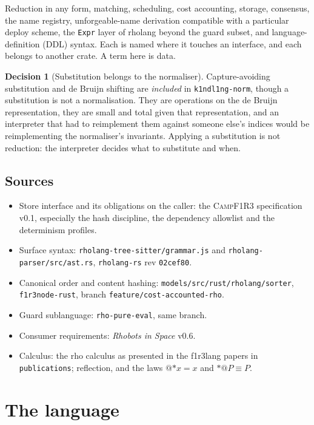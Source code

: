 \documentclass[11pt,a4paper]{article}
\newcommand{\code}[1]{\texttt{#1}}
\newcommand{\Camp}{\textsc{CampF1R3}}
\theoremstyle{definition}
\newtheorem{decision}[definition]{Decision}
\theoremstyle{plain}
\begin{document}
Reduction in any form, matching, scheduling, cost accounting, storage,
consensus, the name registry, unforgeable-name derivation compatible with a
particular deploy scheme, the \code{Expr} layer of rholang beyond the guard
subset, and language-definition (DDL) syntax. Each is named where it touches an
interface, and each belongs to another crate. A term here is data.

\begin{decision}[Substitution belongs to the normaliser]\label{dec:subst}
Capture-avoiding substitution and de Bruijn shifting are \emph{included} in
\code{k1ndl1ng-norm}, though a substitution is not a normalisation. They are
operations on the de Bruijn representation, they are small and total given that
representation, and an interpreter that had to reimplement them against someone
else's indices would be reimplementing the normaliser's invariants. Applying a
substitution is not reduction: the interpreter decides what to substitute and
when.
\end{decision}

\subsection{Sources}

\begin{itemize}[nosep]
\item Store interface and its obligations on the caller: the \Camp{}
  specification v0.1, especially the hash discipline, the dependency allowlist
  and the determinism profiles.
\item Surface syntax: \code{rholang-tree-sitter/grammar.js} and
  \code{rholang-parser/src/ast.rs}, \code{rholang-rs} rev \code{02cef80}.
\item Canonical order and content hashing: \code{models/src/rust/rholang/sorter},
  \code{f1r3node-rust}, branch \code{feature/cost-accounted-rho}.
\item Guard sublanguage: \code{rho-pure-eval}, same branch.
\item Consumer requirements: \emph{Rhobots in Space} v0.6.
\item Calculus: the rho calculus as presented in the f1r3lang papers in
  \code{publications}; reflection, and the laws $@{*x} = x$ and $*@P \equiv P$.
\end{itemize}

\section{The language}\label{sec:lang}
\end{document}
